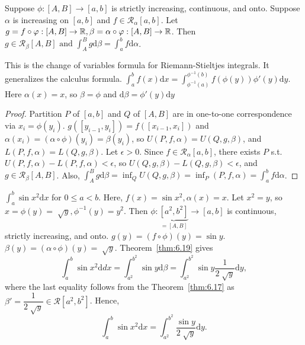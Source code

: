 \begin{thm}[19]
	Suppose $\phi:[A,B]\to [a,b]$ is strictly increasing, continuous, and onto.
	Suppose $\alpha$ is increasing on $[a,b]$ and $f \in \mathscr{R}_{\alpha}[a,b]$.
	Let $g=f \circ \varphi: [A,B]\to \mathbb{R}, \beta=\alpha \circ \varphi: [A,B]\to \mathbb{R}$.
	Then $g \in \mathscr{R}_{\beta}[A,B] \text{ and } \int_{A}^{B}{g\mathrm{d}\beta}= \int_{a}^{b}{f\mathrm{d}\alpha}$.
	\begin{note}
		This is the change of variables formula for Riemann-Stieltjes integrals.
		It generalizes the calculus formula.
		$\int_{a}^{b}{f(x)\mathrm{d}x}=\int_{{\phi ^{-1}}(a)}^{\phi^{-1}(b)}{f(\phi(y))\phi'(y)\mathrm{d}y}$. Here $\alpha(x)=x$, so $\beta=\phi$ and $\mathrm{d}\beta=\phi'(y)\mathrm{d}y$
	\end{note}

	\begin{proof}
		Partition $P$ of $[a,b]$ and $Q$ of $[A,B]$ are in one-to-one correspondence via $x_i=\phi(y_i)$.
		$g([y_{i-1},y_{i}])=f([x_{i-1},x_{i}])$ and $\alpha(x_{i})=(\alpha \circ \phi)(y_i)=\beta(y_i)$, so $U(P,f,\alpha)=U(Q,g,\beta)$, and $L(P,f,\alpha)=L(Q,g,\beta)$.
		Let $\epsilon>0$. Since $f \in \mathscr{R}_{\alpha}[a,b]$, there exists $P$ s.t. $U(P,f,\alpha)-L(P,f,\alpha)<\epsilon$, so $U(Q,g,\beta)-L(Q,g,\beta)<\epsilon$, and $g \in \mathscr{R}_{\beta}[A,B]$.
		Also, $\int_{A}^{B}{g\mathrm{d}\beta}=\inf_{Q}U(Q,g,\beta)=\inf_{P}(P,f,\alpha)=\int_{a}^{b}{f\mathrm{d}\alpha}$.
	\end{proof}
	\begin{example}
		$\int_{a}^{b}{\sin{x^2}\mathrm{d}x}$ for $0\le a<b$.
		Here, $f(x)=\sin{x^2},\alpha(x)=x$.
		Let $x^2=y$, so $x=\phi(y)=\sqrt[]{y}, \phi^{-1}(y)=y^2$.
		Then $\phi:\underbrace{[a^2,b^2]}_{=[A,B]}\to [a,b]$ is continuous, strictly increasing, and onto.
		$g(y)=(f \circ \phi)(y)=\sin{y}$.
		$\beta(y)=(\alpha \circ \phi)(y)=\sqrt[]{y}$.
		Theorem~\ref{thm:6.19} gives
		\[
			\int_{a}^{b}{\sin{x^2}\mathrm{d}dx}
			=\int_{a^2}^{b^2}{\sin{y}\mathrm{d}\beta}
			=\int_{a^2}^{b^2}{\sin{y}\dfrac{1}{2\sqrt[]{y}}\mathrm{d}y}
			,\]
		where the last equality follows from the Theorem~\ref{thm:6.17} as $\beta'=\dfrac{1}{2 \sqrt[]{y}} \in \mathscr{R}[a^2,b^2]$.
		Hence,
		\[
			\int_{a}^{b}{\sin{x^2}\mathrm{d}x}=\int_{a^2}^{b^2}{\dfrac{\sin{y}}{2\sqrt[]{y}}\mathrm{d}y}.
		\]
	\end{example}
\end{thm}

